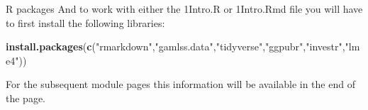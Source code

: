 \documentclass[
  ignorenonframetext,
]{beamer}
\newenvironment{Shaded}{\begin{snugshade}}{\end{snugshade}}
\newcommand{\FunctionTok}[1]{\textcolor[rgb]{0.13,0.29,0.53}{\textbf{#1}}}
\newcommand{\NormalTok}[1]{#1}
\newcommand{\StringTok}[1]{\textcolor[rgb]{0.31,0.60,0.02}{#1}}
\begin{document}
\begin{frame}[fragile]
\begin{block}{R packages}
\protect\hypertarget{r-packages}{}
And to work with either the 1Intro.R or 1Intro.Rmd file you will have to
first install the following libraries:

\begin{Shaded}
\begin{Highlighting}[]
\FunctionTok{install.packages}\NormalTok{(}\FunctionTok{c}\NormalTok{(}\StringTok{"rmarkdown"}\NormalTok{,}\StringTok{"gamlss.data"}\NormalTok{,}\StringTok{"tidyverse"}\NormalTok{,}\StringTok{"ggpubr"}\NormalTok{,}\StringTok{"investr"}\NormalTok{,}\StringTok{"lme4"}\NormalTok{))}
\end{Highlighting}
\end{Shaded}

For the subsequent module pages this information will be available in
the end of the page.
\end{block}
\end{frame}
\end{document}
